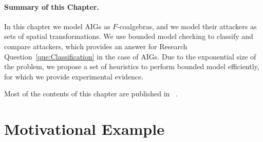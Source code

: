 \paragraph{Summary of this Chapter.} In this chapter we model AIGs as $F$-coalgebras, and we model their attackers as sets of spatial transformations. We use bounded model checking to classify and compare attackers, which provides an answer for Research Question~\ref{que:Classification} in the case of AIGs. Due to the exponential size of the problem, we propose a set of heuristics to perform bounded model efficiently, for which we provide experimental evidence.

Most of the contents of this chapter are published in ~\cite{ClassificationOfAttackers}. 

\section{Motivational Example}
\label{sec:Example}

